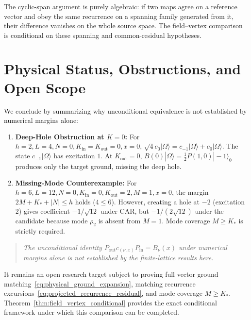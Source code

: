 \begin{remark}
The cyclic-span argument is purely algebraic: if two maps agree on a reference vector and obey the same recurrence on a spanning family generated from it, their difference vanishes on the whole source space. The field--vertex comparison is conditional on these spanning and common-residual hypotheses.
\end{remark}

\section{Physical Status, Obstructions, and Open Scope}

\begin{remark}
We conclude by summarizing why unconditional equivalence is not established by numerical margins alone:
\begin{enumerate}
    \item \textbf{Deep-Hole Obstruction at $K=0$:} For $h = 2, L = 4, N = 0, K_{\mathrm{in}} = K_{\mathrm{out}} = 0, x = 0$, $\sqrt{4} c_0 |\Omega\rangle = c_{-1} |\Omega\rangle + c_0 |\Omega\rangle$. The state $c_{-1} |\Omega\rangle$ has excitation $1$. At $K_{\mathrm{out}} = 0$, $B(0) |\Omega\rangle = \frac{1}{2} P(1, 0) |-1\rangle_0$ produces only the target ground, missing the deep hole.
    \item \textbf{Missing-Mode Counterexample:} For $h = 6, L = 12, N = 0, K_{\mathrm{in}} = 0, K_{\mathrm{out}} = 2, M = 1, x = 0$, the margin $2M + K_* + |N| \le h$ holds ($4 \le 6$). However, creating a hole at $-2$ (excitation $2$) gives coefficient $-1/\sqrt{12}$ under CAR, but $-1/(2\sqrt{12})$ under the candidate because mode $\rho_2$ is absent from $M = 1$. Mode coverage $M \ge K_*$ is strictly required.
\end{enumerate}

\begin{quote}
\emph{The unconditional identity $P_{\mathrm{out}} c_{(\nu, x)} P_{\mathrm{in}} = B_\nu(x)$ under numerical margins alone is not established by the finite-lattice results here.}
\end{quote}
It remains an open research target subject to proving full vector ground matching~\eqref{eq:physical_ground_expansion}, matching recurrence excursions~\eqref{eq:projected_recurrence_residual}, and mode coverage $M \ge K_*$. Theorem~\ref{thm:field_vertex_conditional} provides the exact conditional framework under which this comparison can be completed.
\end{remark}
